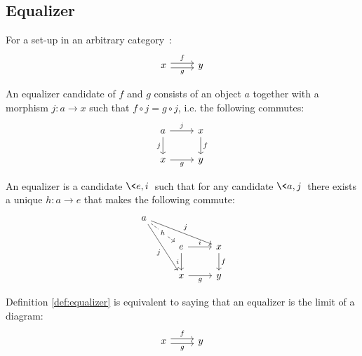 \subsection{Equalizer}

\begin{definition}
  For a set-up in an arbitrary
  category~\parencite[p.~112]{leinster:basic_category_theory}:
  \[\begin{tikzcd}[ampersand replacement=\&]
    x \& y
    \arrow["f", shift left=1, from=1-1, to=1-2]
    \arrow["g"', shift right=1, from=1-1, to=1-2]
  \end{tikzcd}\]

  An equalizer candidate of $f$ and $g$ consists of an object $a$ together with
  a morphism $j:a\to x$ such that $f\circ j = g\circ j$, i.e. the following commutes:
  \[\begin{tikzcd}[ampersand replacement=\&]
    a \& x \\
    x \& y
    \arrow["f", from=1-2, to=2-2]
    \arrow["g"', from=2-1, to=2-2]
    \arrow["j"', from=1-1, to=2-1]
    \arrow["j", from=1-1, to=1-2]
  \end{tikzcd}\]

  An equalizer is a candidate $\<e, i\>$ such that for any candidate $\<a, j\>$
  there exists a unique $h:a\to e$ that makes the following commute:
  \[\begin{tikzcd}[ampersand replacement=\&]
    a \\
    \& e \& x \\
    \& x \& y
    \arrow["i"', from=2-2, to=3-2]
    \arrow["i", from=2-2, to=2-3]
    \arrow["f", from=2-3, to=3-3]
    \arrow["g"', from=3-2, to=3-3]
    \arrow["j"', from=1-1, to=3-2]
    \arrow["j", from=1-1, to=2-3]
    \arrow["h"{description}, dashed, from=1-1, to=2-2]
  \end{tikzcd}\]
\end{definition}

\begin{definition}
  Definition \ref{def:equalizer} is equivalent to saying that an equalizer is
  the limit of a diagram:
  \[\begin{tikzcd}[ampersand replacement=\&]
    x \& y
    \arrow["f", shift left=1, from=1-1, to=1-2]
    \arrow["g"', shift right=1, from=1-1, to=1-2]
  \end{tikzcd}\]
\end{definition}